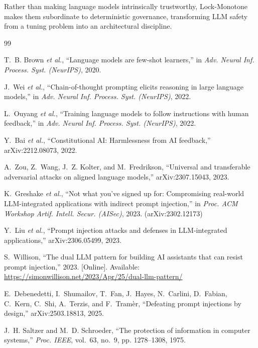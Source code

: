\documentclass[conference]{IEEEtran}
\begin{document}
Rather than making language models intrinsically trustworthy,
Lock-Monotone makes them subordinate to deterministic governance,
transforming LLM safety from a tuning problem into an architectural
discipline.

\begin{thebibliography}{99}
\small

T.~B. Brown \emph{et al.}, ``Language models are few-shot learners,'' in
\emph{Adv. Neural Inf. Process. Syst. (NeurIPS)}, 2020.

J.~Wei \emph{et al.}, ``Chain-of-thought prompting elicits reasoning in
large language models,'' in \emph{Adv. Neural Inf. Process. Syst.
(NeurIPS)}, 2022.

L.~Ouyang \emph{et al.}, ``Training language models to follow instructions
with human feedback,'' in \emph{Adv. Neural Inf. Process. Syst.
(NeurIPS)}, 2022.

Y.~Bai \emph{et al.}, ``Constitutional AI: Harmlessness from AI
feedback,'' arXiv:2212.08073, 2022.

A.~Zou, Z.~Wang, J.~Z. Kolter, and M.~Fredrikson, ``Universal and
transferable adversarial attacks on aligned language models,''
arXiv:2307.15043, 2023.

K.~Greshake \emph{et al.}, ``Not what you've signed up for: Compromising
real-world LLM-integrated applications with indirect prompt injection,''
in \emph{Proc. ACM Workshop Artif. Intell. Secur. (AISec)}, 2023.
(arXiv:2302.12173)

Y.~Liu \emph{et al.}, ``Prompt injection attacks and defenses in
LLM-integrated applications,'' arXiv:2306.05499, 2023.

S.~Willison, ``The dual LLM pattern for building AI assistants that can
resist prompt injection,'' 2023. [Online]. Available:
\url{https://simonwillison.net/2023/Apr/25/dual-llm-pattern/}

E.~Debenedetti, I.~Shumailov, T.~Fan, J.~Hayes, N.~Carlini, D.~Fabian,
C.~Kern, C.~Shi, A.~Terzis, and F.~Tram\`er, ``Defeating prompt injections
by design,'' arXiv:2503.18813, 2025.

J.~H. Saltzer and M.~D. Schroeder, ``The protection of information in
computer systems,'' \emph{Proc. IEEE}, vol.~63, no.~9, pp. 1278--1308,
1975.


\end{thebibliography}
\end{document}
